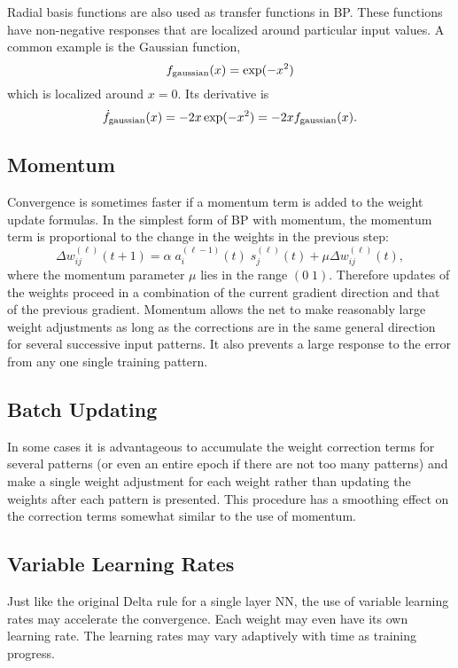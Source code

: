 \documentclass[fleqn]{article}
\begin{document}
Radial basis functions are also used as transfer functions in BP.
These functions have non-negative responses that are localized
around particular input values.
A common example is the Gaussian function,
\[
f_{\mbox{\scriptsize{gaussian}}}(x) = \exp(-x^2)
\]
which is localized around $x=0$.
Its derivative is
\[
\dot f_{\mbox{\scriptsize{gaussian}}}(x) = -2 x \exp(-x^2) = -2 x f_{\mbox{\scriptsize{gaussian}}}(x).
\]

\subsection{Momentum}

Convergence is sometimes faster if a momentum term is added to the weight update formulas.
In the simplest form of BP with momentum,
the momentum term is proportional to the change in the weights in the previous step:
\[
\Delta w_{ij}^{(\ell)}(t+1) = \alpha \; a_i^{(\ell-1)}(t) \; s_j^{(\ell)}(t) + \mu \Delta w_{ij}^{(\ell)}(t),
\]
where the momentum parameter $\mu$ lies in the range $(0\; 1)$.
Therefore updates of the weights proceed in a combination of the current gradient direction and
that of the previous gradient.
Momentum allows the net to make reasonably large weight adjustments as long as
the corrections are in the same general direction for several successive input patterns.
It also prevents a large response to the error from any one single training pattern.

\subsection{Batch Updating}

In some cases it is advantageous to accumulate the weight correction terms for several patterns
(or even an entire epoch if there are not too many patterns)
and make a single weight adjustment for each weight rather than updating the weights after each pattern is presented.
This procedure has a smoothing effect on the correction terms somewhat similar to the use of momentum.

\subsection{Variable Learning Rates}

Just like the original Delta rule for a single layer NN,
the use of variable learning rates may accelerate the convergence.
Each weight may even have its own learning rate.
The learning rates may vary adaptively with time as training progress.
\end{document}
